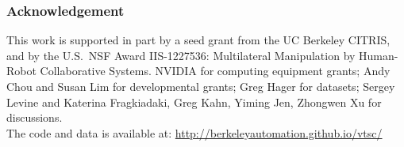 \documentclass[letterpaper, 10 pt, conference]{ieeeconf}
\begin{document}
\subsubsection*{Acknowledgement}
This work is supported in part by a seed grant from the UC Berkeley CITRIS, and by the U.S.\ NSF Award IIS-1227536: Multilateral Manipulation by Human-Robot Collaborative Systems.  NVIDIA for computing equipment grants; Andy Chou and Susan Lim for developmental grants; Greg Hager for datasets; Sergey Levine and Katerina Fragkiadaki, Greg Kahn, Yiming Jen, Zhongwen Xu for discussions.\\
The code and data is available at: 
\href{http://berkeleyautomation.github.io/surgical-tools/}{http://berkeleyautomation.github.io/vtsc/}



\end{document}
